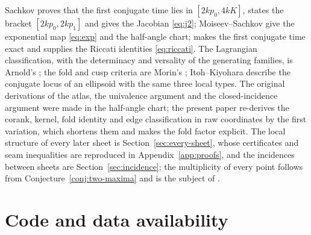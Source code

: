 \documentclass[11pt]{article}
\theoremstyle{remark}
\begin{document}
Sachkov \cite{Sachkov2010Conjugate} proves that the first conjugate time
lies in $[2kp_0,4kK]$, states the bracket $[2kp_0,2kp_1]$ and gives the
Jacobian \eqref{eq:j2};
Moiseev--Sachkov \cite{MoiseevSachkov2010Maxwell} give the exponential map
\eqref{eq:exp} and the half-angle chart; \cite{SE2FirstConjugate} makes the
first conjugate time exact and supplies the Riccati identities
\eqref{eq:riccati}.  The Lagrangian classification, with the
determinacy and versality of the generating families, is Arnold's
\cite{Arnold1972NormalForms}; the fold and cusp criteria are Morin's
\cite[Chapter~VII]{GolubitskyGuillemin1973}; Itoh--Kiyohara
\cite{ItohKiyohara2021} describe the conjugate locus of an ellipsoid with
the same three local types.  The
original derivations of the atlas, the univalence argument and the
closed-incidence argument were made in the half-angle chart; the present
paper re-derives the corank, kernel, fold identity and edge classification
in raw coordinates by the first variation, which shortens them and makes
the fold factor explicit.  The local structure of every later sheet is
Section~\ref{sec:every-sheet}, whose certificates and seam inequalities
are reproduced in Appendix~\ref{app:proofs}, and the incidences between
sheets are Section~\ref{sec:incidence}; the
multiplicity of every point follows from Conjecture~\ref{conj:two-maxima}
and is the subject of \cite{SE2Counts}.

\section*{Code and data availability}
\end{document}
